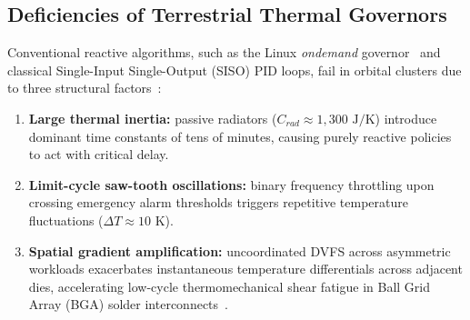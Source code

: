 \documentclass[a4paper,fleqn]{cas-dc}
\begin{document}
\subsection{Deficiencies of Terrestrial Thermal Governors}
Conventional reactive algorithms, such as the Linux \textit{ondemand} governor~\citep{pallipadi2006ondemand} and classical Single-Input Single-Output (SISO) PID loops, fail in orbital clusters due to three structural factors~\citep{brooks2001dtm, skadron2004hotspot, hoffmann2021online}:
\begin{enumerate}
\item \textbf{Large thermal inertia:} passive radiators ($C_{rad} \approx 1,300\text{ J/K}$) introduce dominant time constants of tens of minutes, causing purely reactive policies to act with critical delay.
\item \textbf{Limit-cycle saw-tooth oscillations:} binary frequency throttling upon crossing emergency alarm thresholds triggers repetitive temperature fluctuations ($\Delta T \approx 10\text{ K}$).
\item \textbf{Spatial gradient amplification:} uncoordinated DVFS across asymmetric workloads exacerbates instantaneous temperature differentials across adjacent dies, accelerating low-cycle thermomechanical shear fatigue in Ball Grid Array (BGA) solder interconnects~\citep{manson1966fatigue}.
\end{enumerate}
\end{document}
